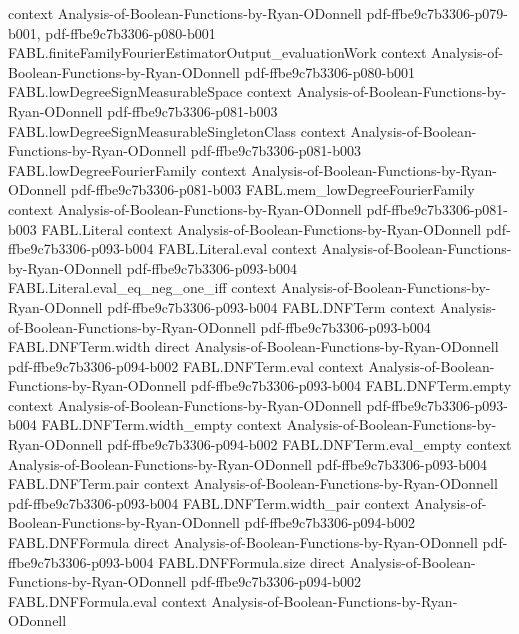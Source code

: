 \begin{theorem}
  {context}
  {Analysis-of-Boolean-Functions-by-Ryan-ODonnell}
  {pdf-ffbe9c7b3306-p079-b001,
    pdf-ffbe9c7b3306-p080-b001}
\proofstep
  {FABL.finiteFamilyFourierEstimatorOutput_evaluationWork}
  {context}
  {Analysis-of-Boolean-Functions-by-Ryan-ODonnell}
  {pdf-ffbe9c7b3306-p080-b001}
\proofstep
  {FABL.lowDegreeSignMeasurableSpace}
  {context}
  {Analysis-of-Boolean-Functions-by-Ryan-ODonnell}
  {pdf-ffbe9c7b3306-p081-b003}
\proofstep
  {FABL.lowDegreeSignMeasurableSingletonClass}
  {context}
  {Analysis-of-Boolean-Functions-by-Ryan-ODonnell}
  {pdf-ffbe9c7b3306-p081-b003}
\proofstep
  {FABL.lowDegreeFourierFamily}
  {context}
  {Analysis-of-Boolean-Functions-by-Ryan-ODonnell}
  {pdf-ffbe9c7b3306-p081-b003}
\proofstep
  {FABL.mem_lowDegreeFourierFamily}
  {context}
  {Analysis-of-Boolean-Functions-by-Ryan-ODonnell}
  {pdf-ffbe9c7b3306-p081-b003}
\proofstep
  {FABL.Literal}
  {context}
  {Analysis-of-Boolean-Functions-by-Ryan-ODonnell}
  {pdf-ffbe9c7b3306-p093-b004}
\proofstep
  {FABL.Literal.eval}
  {context}
  {Analysis-of-Boolean-Functions-by-Ryan-ODonnell}
  {pdf-ffbe9c7b3306-p093-b004}
\proofstep
  {FABL.Literal.eval_eq_neg_one_iff}
  {context}
  {Analysis-of-Boolean-Functions-by-Ryan-ODonnell}
  {pdf-ffbe9c7b3306-p093-b004}
\proofstep
  {FABL.DNFTerm}
  {context}
  {Analysis-of-Boolean-Functions-by-Ryan-ODonnell}
  {pdf-ffbe9c7b3306-p093-b004}
\proofstep
  {FABL.DNFTerm.width}
  {direct}
  {Analysis-of-Boolean-Functions-by-Ryan-ODonnell}
  {pdf-ffbe9c7b3306-p094-b002}
\proofstep
  {FABL.DNFTerm.eval}
  {context}
  {Analysis-of-Boolean-Functions-by-Ryan-ODonnell}
  {pdf-ffbe9c7b3306-p093-b004}
\proofstep
  {FABL.DNFTerm.empty}
  {context}
  {Analysis-of-Boolean-Functions-by-Ryan-ODonnell}
  {pdf-ffbe9c7b3306-p093-b004}
\proofstep
  {FABL.DNFTerm.width_empty}
  {context}
  {Analysis-of-Boolean-Functions-by-Ryan-ODonnell}
  {pdf-ffbe9c7b3306-p094-b002}
\proofstep
  {FABL.DNFTerm.eval_empty}
  {context}
  {Analysis-of-Boolean-Functions-by-Ryan-ODonnell}
  {pdf-ffbe9c7b3306-p093-b004}
\proofstep
  {FABL.DNFTerm.pair}
  {context}
  {Analysis-of-Boolean-Functions-by-Ryan-ODonnell}
  {pdf-ffbe9c7b3306-p093-b004}
\proofstep
  {FABL.DNFTerm.width_pair}
  {context}
  {Analysis-of-Boolean-Functions-by-Ryan-ODonnell}
  {pdf-ffbe9c7b3306-p094-b002}
\proofstep
  {FABL.DNFFormula}
  {direct}
  {Analysis-of-Boolean-Functions-by-Ryan-ODonnell}
  {pdf-ffbe9c7b3306-p093-b004}
\proofstep
  {FABL.DNFFormula.size}
  {direct}
  {Analysis-of-Boolean-Functions-by-Ryan-ODonnell}
  {pdf-ffbe9c7b3306-p094-b002}
\proofstep
  {FABL.DNFFormula.eval}
  {context}
  {Analysis-of-Boolean-Functions-by-Ryan-ODonnell}

\end{theorem}
